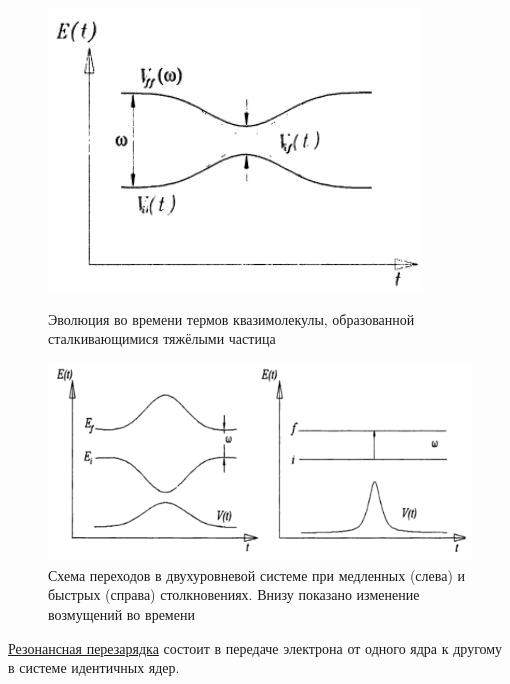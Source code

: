 \documentclass[10pt, a4paper]{article}
\begin{document}
\begin{figure}[h]
	\begin{center}
		\begin{minipage}[h]{0.49\linewidth}
			\includegraphics[width=1\linewidth]{heavy_particle.jpg}
			\caption{Эволюция во времени термов квазимолекулы, образованной
сталкивающимися тяжёлыми частица} 
			\label{fig:terms_quasimol}
		\end{minipage}
		\hfill
		\begin{minipage}[h]{0.49\linewidth}
			\includegraphics[width=1\linewidth]{2levels_transition.png}
			\caption{Схема переходов в двухуровневой системе при медленных
				(слева) и быстрых (справа) столкновениях. Внизу показано изменение
возмущений во времени}
			\label{fig:transitions_2levels}
		\end{minipage}
	\end{center}
\end{figure}

\uline{Резонансная перезарядка} состоит в передаче электрона от одного ядра к другому в системе идентичных ядер.
\end{document}
